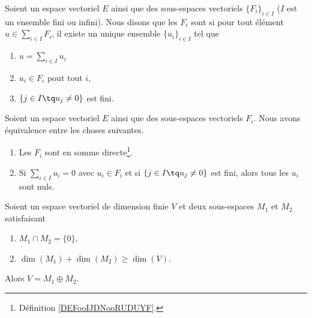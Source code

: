 \begin{definition}       \label{DEFooIJDNooRUDUYF}
    Soient un espace vectoriel \( E\) ainsi que des sous-espaces vectoriels \( \{ F_i \}_{i\in I}\) (\( I\) est un ensemble fini ou infini). Nous disons que les \( F_i\) sont  si pour tout élément \( u\in\sum_{i\in I}F_i\), il existe un unique ensemble \( \{ u_i \}_{i\in I}\) tel que
    \begin{enumerate}
        \item
            \( u=\sum_{i\in I}u_i\)
        \item
            \( u_i\in F_i\) pout tout \( i\),
        \item
            \( \{ j\in I\tq u_j\neq 0 \}\) est fini.
    \end{enumerate}
\end{definition} 

\begin{lemma}       \label{LEMooDQMQooInVVDY}
    Soient un espace vectoriel \( E\) ainsi que des sous-espaces vectoriels \( F_i\). Nous avons équivalence entre les choses suivantes.

    \begin{enumerate}
        \item
            Les \( F_i\) sont en somme directe\footnote{Définition \ref{DEFooIJDNooRUDUYF}.}.
        \item
            Si \( \sum_{i\in I}u_i=0\) avec \( u_i\in F_i\) et si \( \{ j\in I\tq u_j\neq 0 \}\) est fini, alors tous les \( u_i\) sont nuls.
    \end{enumerate}
\end{lemma}

\begin{proposition}       \label{PROPooCASNooEqisqa}
    Soient un espace vectoriel de dimension finie \( V\) et deux sous-espaces \( M_1\) et \( M_2\) satisfaisant
    \begin{enumerate}
        \item
            \( M_1\cap M_2=\{ 0 \}\),
        \item
            \( \dim(M_1)+\dim(M_2)\geq \dim(V)\).
    \end{enumerate}
    Alors \( V=M_1\oplus M_2\).
\end{proposition}

